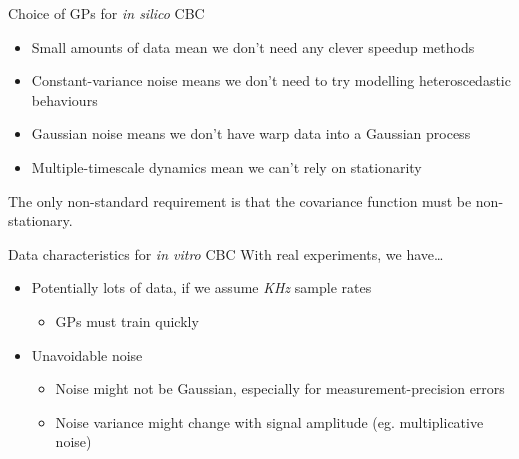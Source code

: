 \documentclass[presentation]{beamer}
\begin{document}
\begin{frame}[label={sec:org561662a}]{Choice of GPs for \emph{in silico} CBC}
\begin{itemize}
\item Small amounts of data mean we don't need any clever speedup methods
\item Constant-variance noise means we don't need to try modelling heteroscedastic behaviours
\item Gaussian noise means we don't have warp data into a Gaussian process
\item Multiple-timescale dynamics mean we can't rely on stationarity
\end{itemize}

\vfill

The only non-standard requirement is that the covariance function must be non-stationary.
\end{frame}

\begin{frame}[label={sec:org8a183d6}]{Data characteristics for \emph{in vitro} CBC}
With real experiments, we have\ldots{}

\vfill

\begin{itemize}
\item Potentially lots of data, if we assume \emph{KHz} sample rates
\begin{itemize}
\item GPs must train quickly
\end{itemize}
\item Unavoidable noise
\begin{itemize}
\item Noise might not be Gaussian, especially for measurement-precision errors
\item Noise variance might change with signal amplitude (eg. multiplicative noise)
\end{itemize}
\end{itemize}
\end{frame}
\end{document}
